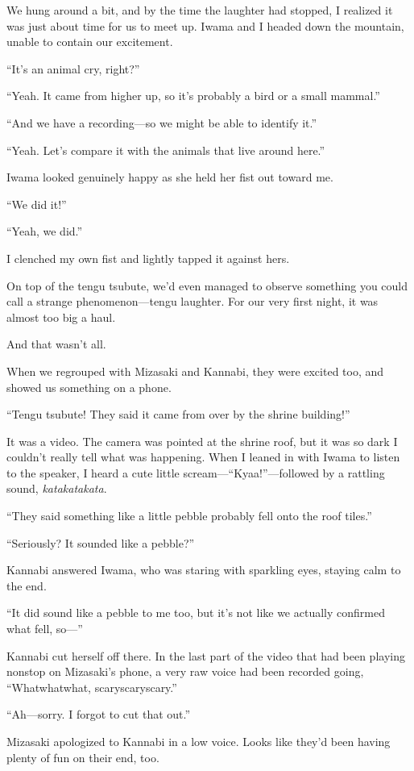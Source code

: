 \documentclass[
    a4paper,
    12pt,
    twoside,
    openany,
    UTF8,
    fontset=windows
]{ctexbook}
\begin{document}
We hung around a bit, and by the time the laughter had stopped, I realized it was just about time for us to meet up. Iwama and I headed down the mountain, unable to contain our excitement.

``It's an animal cry, right?''

``Yeah. It came from higher up, so it's probably a bird or a small mammal.''

``And we have a recording---so we might be able to identify it.''

``Yeah. Let's compare it with the animals that live around here.''

Iwama looked genuinely happy as she held her fist out toward me.

``We did it!''

``Yeah, we did.''

I clenched my own fist and lightly tapped it against hers.

On top of the tengu tsubute, we'd even managed to observe something you could call a strange phenomenon---tengu laughter. For our very first night, it was almost too big a haul.

And that wasn't all.

When we regrouped with Mizasaki and Kannabi, they were excited too, and showed us something on a phone.

``Tengu tsubute! They said it came from over by the shrine building!''

It was a video. The camera was pointed at the shrine roof, but it was so dark I couldn't really tell what was happening. When I leaned in with Iwama to listen to the speaker, I heard a cute little scream---``Kyaa!''---followed by a rattling sound, \textit{katakatakata}.

``They said something like a little pebble probably fell onto the roof tiles.''

``Seriously? It sounded like a pebble?''

Kannabi answered Iwama, who was staring with sparkling eyes, staying calm to the end.

``It did sound like a pebble to me too, but it's not like we actually confirmed what fell, so---''

Kannabi cut herself off there. In the last part of the video that had been playing nonstop on Mizasaki's phone, a very raw voice had been recorded going, ``Whatwhatwhat, scaryscaryscary.''

``Ah---sorry. I forgot to cut that out.''

Mizasaki apologized to Kannabi in a low voice. Looks like they'd been having plenty of fun on their end, too.
\end{document}
